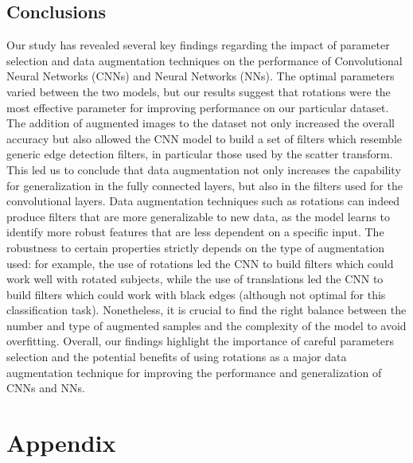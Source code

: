 \documentclass{report}
\begin{document}
\chapter{Conclusions}

Our study has revealed several key findings regarding the impact of parameter selection and data augmentation 
techniques on the performance of Convolutional Neural Networks (CNNs) and Neural Networks (NNs). The optimal 
parameters varied between the two models, but our results suggest that rotations were the most effective 
parameter for improving performance on our particular dataset.
The addition of augmented images to the dataset not only increased the overall accuracy but also allowed the CNN model to build a set of filters which resemble generic edge detection filters, in particular those used by the scatter transform.
This led us to conclude that data augmentation not only increases the capability for generalization in the fully connected layers, but also in the filters used for the convolutional layers.
Data augmentation techniques such as rotations can indeed produce filters that 
are more generalizable to new data, as the model learns to identify more robust features that are less 
dependent on a specific input. The robustness to certain properties strictly depends on the type of augmentation used: 
for example, the use of rotations led the CNN to build filters which could work well with rotated subjects, while the use of translations led the CNN to build filters which could work with black edges (although not optimal for this classification task). 
Nonetheless, it is crucial to find the right balance between the 
number and type of augmented samples and the complexity of the model to avoid overfitting. Overall, our findings 
highlight the importance of careful parameters selection and the potential benefits of using rotations as a major data 
augmentation technique for improving the performance and generalization of CNNs and NNs.

\pagebreak

\part{Appendix}
\appendix
\end{document}
